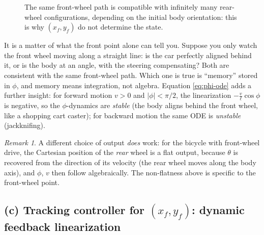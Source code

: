 \documentclass[11pt,a4paper]{article}
\theoremstyle{definition}
\theoremstyle{plain}
\theoremstyle{remark}
\newtheorem{remark}[definition]{Remark}
\begin{document}
\begin{figure}[H]
\centering
{}
\caption{The same front-wheel path is compatible with infinitely many rear-wheel configurations, depending on the initial body orientation: this is why $(x_f,y_f)$ do not determine the state.}
\end{figure}

\begin{intuition}
It is a matter of what the front point alone can tell you. Suppose you only watch the front wheel moving along a straight line: is the car perfectly aligned behind it, or is the body at an angle, with the steering compensating? Both are consistent with the same front-wheel path. Which one is true is ``memory'' stored in $\phi$, and memory means integration, not algebra. Equation \eqref{eq:phi-ode} adds a further insight: for forward motion $v>0$ and $|\phi|<\pi/2$, the linearization $-\frac{v}{\ell}\cos\phi$ is negative, so the $\phi$-dynamics are \emph{stable} (the body aligns behind the front wheel, like a shopping cart caster); for backward motion the same ODE is \emph{unstable} (jackknifing).
\end{intuition}

\begin{remark}
A different choice of output \emph{does} work: for the bicycle with front-wheel drive, the Cartesian position of the \emph{rear} wheel is a flat output, because $\theta$ is recovered from the direction of its velocity (the rear wheel moves along the body axis), and $\phi$, $v$ then follow algebraically. The non-flatness above is specific to the front-wheel point.
\end{remark}

\subsection{(c) Tracking controller for $(x_f,y_f)$: dynamic feedback linearization}
\end{document}
